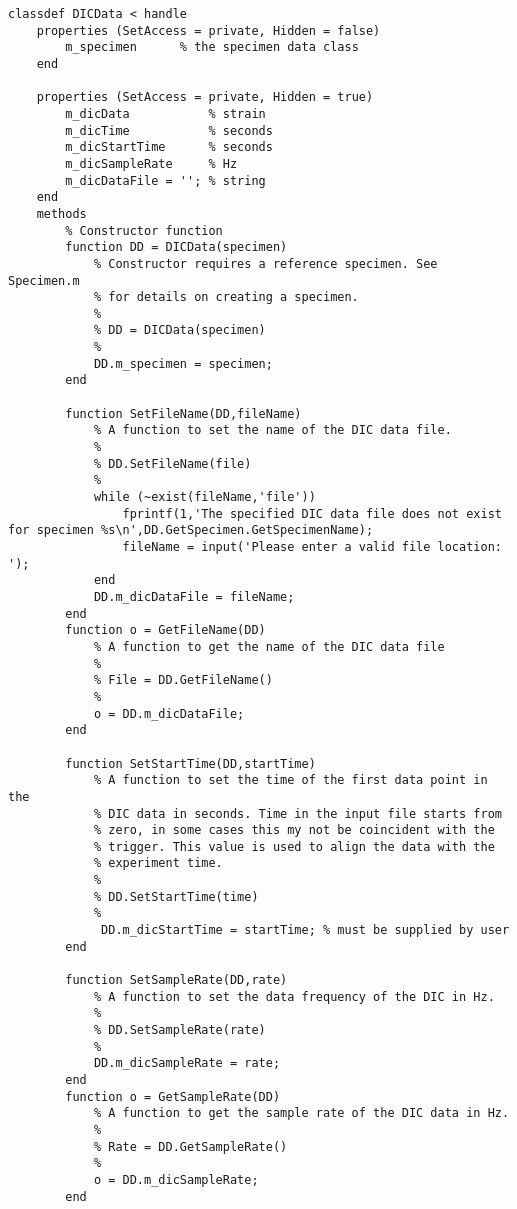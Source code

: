 \begin{lstlisting}
classdef DICData < handle
    properties (SetAccess = private, Hidden = false)
        m_specimen      % the specimen data class    
    end
    
    properties (SetAccess = private, Hidden = true)
        m_dicData           % strain
        m_dicTime           % seconds
        m_dicStartTime      % seconds
        m_dicSampleRate     % Hz
        m_dicDataFile = ''; % string
    end
    methods
        % Constructor function
        function DD = DICData(specimen)
            % Constructor requires a reference specimen. See Specimen.m
            % for details on creating a specimen.
            %
            % DD = DICData(specimen)
            %
            DD.m_specimen = specimen;
        end
        
        function SetFileName(DD,fileName)
            % A function to set the name of the DIC data file.
            %
            % DD.SetFileName(file)
            %
            while (~exist(fileName,'file'))
                fprintf(1,'The specified DIC data file does not exist for specimen %s\n',DD.GetSpecimen.GetSpecimenName);
                fileName = input('Please enter a valid file location: ');
            end                
            DD.m_dicDataFile = fileName;
        end
        function o = GetFileName(DD)
            % A function to get the name of the DIC data file
            %
            % File = DD.GetFileName()
            %
            o = DD.m_dicDataFile;
        end
        
        function SetStartTime(DD,startTime)
            % A function to set the time of the first data point in the
            % DIC data in seconds. Time in the input file starts from
            % zero, in some cases this my not be coincident with the
            % trigger. This value is used to align the data with the
            % experiment time.
            %
            % DD.SetStartTime(time)
            %
             DD.m_dicStartTime = startTime; % must be supplied by user
        end
        
        function SetSampleRate(DD,rate)
            % A function to set the data frequency of the DIC in Hz.
            %
            % DD.SetSampleRate(rate)
            %
            DD.m_dicSampleRate = rate;
        end
        function o = GetSampleRate(DD)
            % A function to get the sample rate of the DIC data in Hz.
            %
            % Rate = DD.GetSampleRate()
            %
            o = DD.m_dicSampleRate;
        end
        

\end{lstlisting}
